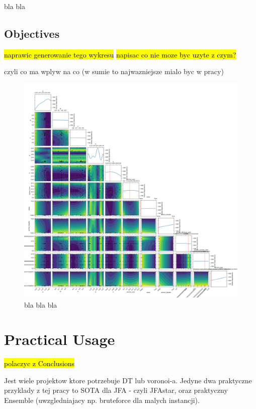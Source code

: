 \documentclass[format=acmsmall,screen,review,authordraft,nonacm]{acmart}
\begin{document}
bla bla

\subsection{Objectives} %

\hl{naprawic generowanie tego wykresu}
\hl{napisac co nie moze byc uzyte z czym?}

czyli co ma wplyw na co (w sumie to najwazniejsze mialo byc w pracy)

\begin{figure}[H]
	\centering
	\includegraphics[width=\linewidth]{../figures/raport}
	\caption{bla bla bla}
	\label{fig:abstract}
\end{figure}

\section{Practical Usage} %

\hl{polaczyc z Conclusions}

Jest wiele projektow ktore potrzebuje DT lub voronoi-a. Jedyne dwa praktyczne
przyklady z tej pracy to SOTA dla JFA - czyli JFAstar, oraz praktyczny Ensemble
(uwzgledniajacy np. bruteforce dla malych instancji).
\end{document}
